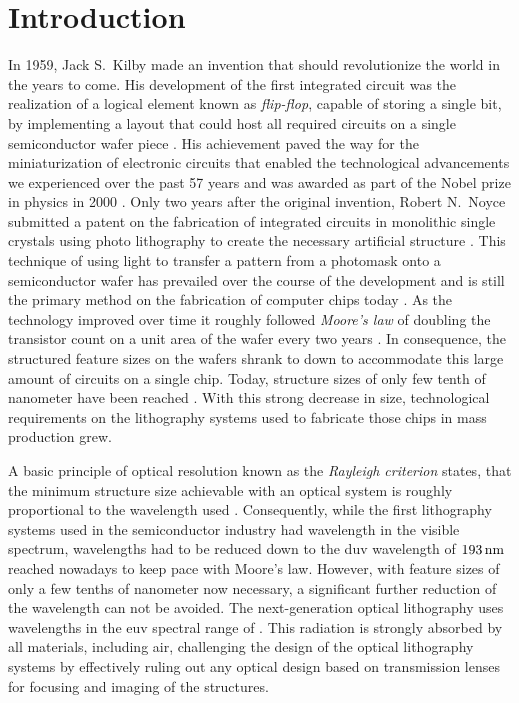 \chapter{Introduction} \label{ch:Intro}
In 1959, Jack S.~Kilby made an invention that should revolutionize the world in the years to come. His development of the first integrated circuit was the realization of a logical element known as \emph{flip-flop}, capable of storing a single bit, by implementing a layout that could host all required circuits on a single semiconductor wafer piece  \cite{kilby_invention_1976}. His achievement paved the way for the miniaturization of electronic circuits that enabled the technological advancements we experienced over the past 57 years and was awarded as part of the Nobel prize in physics in 2000 \cite{noauthor_press_nodate}. Only two years after the original invention, Robert N.~Noyce submitted a patent on the fabrication of integrated circuits in monolithic single crystals using photo lithography to create the necessary artificial structure \cite{noyce_semiconductor_1961}. This technique of using light to transfer a pattern from a photomask onto a semiconductor wafer has prevailed over the course of the development and is still the primary method on the fabrication of computer chips today \cite{mack_fundamental_2008}. As the technology improved over time it roughly followed \emph{Moore's law} of doubling the transistor count on a unit area of the wafer every two years \cite{moore_cramming_1998}. In consequence, the structured feature sizes on the wafers shrank to down to accommodate this large amount of circuits on a single chip. Today, structure sizes of only few tenth of nanometer have been reached \cite{international_roadmap_committee_international_2015}. With this strong decrease in size, technological requirements on the lithography systems used to fabricate those chips in mass production grew.

A basic principle of optical resolution known as the \emph{Rayleigh criterion} states, that the minimum structure size achievable with an optical system is roughly proportional to the wavelength used \cite{lord_rayleigh_xxxi._1879}. Consequently, while the first lithography systems used in the semiconductor industry had wavelength in the visible spectrum, wavelengths had to be reduced down to the \gls{duv} wavelength of $\nm{193}$ reached nowadays to keep pace with Moore's law. However, with feature sizes of only a few tenths of nanometer now necessary, a significant further reduction of the wavelength can not be avoided. The next-generation optical lithography uses wavelengths in the \gls{euv} spectral range of . This radiation is strongly absorbed by all materials, including air, challenging the design of the optical lithography systems by effectively ruling out any optical design based on transmission lenses for focusing and imaging of the structures.

